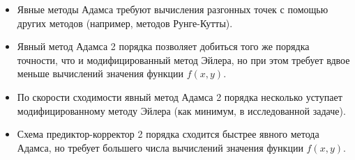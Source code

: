 \documentclass[a4paper, 12pt]{article}
\begin{document}
	\begin{itemize}
		\item Явные методы Адамса требуют вычисления разгонных точек с помощью других методов (например, методов Рунге-Кутты).
		\item Явный метод Адамса 2 порядка позволяет добиться того же порядка точности, что и модифицированный метод Эйлера, но при этом требует вдвое меньше вычислений значения функции $f(x,y)$.
		\item По скорости сходимости явный метод Адамса 2 порядка несколько уступает модифицированному методу Эйлера (как минимум, в исследованной задаче).
		\item Схема предиктор-корректор 2 порядка сходится быстрее явного метода Адамса, но требует большего числа вычислений значения функции $f(x,y)$.
	\end{itemize}
	
\end{document}
